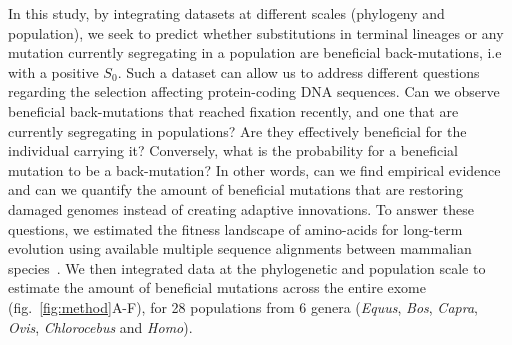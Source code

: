 \documentclass{article}
\newcommand{\Sphy}{S_{0}}
\begin{document}
    In this study, by integrating datasets at different scales (phylogeny and population), we seek to predict whether substitutions in terminal lineages or any mutation currently segregating in a population are beneficial back-mutations, i.e with a positive $\Sphy$.
    Such a dataset can allow us to address different questions regarding the selection affecting protein-coding DNA sequences.
    Can we observe beneficial back-mutations that reached fixation recently, and one that are currently segregating in populations?
    Are they effectively beneficial for the individual carrying it?
    Conversely, what is the probability for a beneficial mutation to be a back-mutation?
    In other words, can we find empirical evidence and can we quantify the amount of beneficial mutations that are restoring damaged genomes instead of creating adaptive innovations.
    To answer these questions, we estimated the fitness landscape of amino-acids for long-term evolution using available multiple sequence alignments between mammalian species~\cite{ranwez_orthomam_2007, howe_ensembl_2021}.
    We then integrated data at the phylogenetic and population scale to estimate the amount of beneficial mutations across the entire exome (fig.~\ref{fig:method}A-F), for 28 populations from 6 genera (\textit{Equus},  \textit{Bos}, \textit{Capra}, \textit{Ovis}, \textit{Chlorocebus} and \textit{Homo}).
\end{document}
